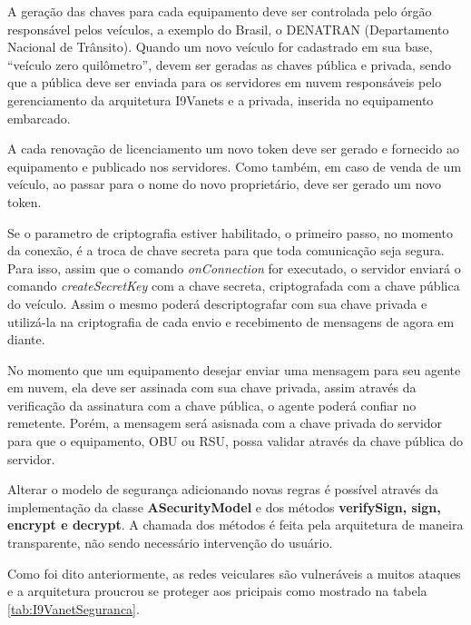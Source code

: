 \documentclass[
	12pt,				%
	oneside,			%
	a4paper,			%
	english,			%
	brazil				%
	]{abntex2ppgsi}
\begin{document}
A geração das chaves para cada equipamento deve ser controlada pelo órgão responsável pelos veículos, a exemplo do Brasil, o DENATRAN (Departamento Nacional de Trânsito). Quando um novo veículo for cadastrado em sua base, ``veículo zero quilômetro'', devem ser geradas as chaves pública e privada, sendo que a pública deve ser enviada para os servidores em nuvem  responsáveis  pelo gerenciamento da arquitetura I9Vanets e a privada, inserida no equipamento embarcado.

A cada renovação de licenciamento um novo token deve ser gerado e fornecido ao equipamento e publicado nos servidores. Como também, em caso de venda de um veículo, ao passar para o nome do novo proprietário, deve ser gerado um novo token.

Se o parametro de criptografia estiver habilitado, o primeiro passo, no momento da conexão, é a troca de chave secreta para que toda comunicação seja segura. Para isso, assim que o comando \textit{onConnection} for executado, o servidor enviará o comando \textit{createSecretKey} com a chave secreta, criptografada com a chave pública do veículo. Assim o mesmo poderá descriptografar com sua chave privada e utilizá-la na criptografia de cada envio e recebimento de mensagens de agora em diante. 

No momento que um equipamento desejar enviar uma mensagem para seu agente em nuvem, ela deve ser assinada com sua chave privada, assim através da verificação da assinatura com a chave pública, o agente poderá confiar no remetente. Porém, a mensagem será asisnada com a chave privada do servidor para que o equipamento, OBU ou RSU, possa validar através da chave pública do servidor.


Alterar o modelo de segurança adicionando novas regras é possível através da implementação da classe \textbf{ASecurityModel} e dos métodos \textbf{verifySign, sign, encrypt e decrypt}. A chamada dos métodos é feita pela arquitetura de maneira transparente, não sendo necessário intervenção do usuário.

Como foi dito anteriormente,  as redes veiculares são vulneráveis a muitos ataques e a arquitetura proucrou se proteger aos pricipais como mostrado na tabela \ref{tab:I9VanetSeguranca}.
\end{document}
